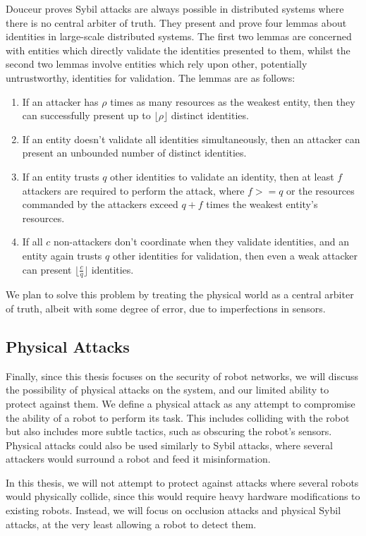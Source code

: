 Douceur \cite{SybilAttack} proves Sybil attacks are always possible in distributed systems where there is no central arbiter of truth. They present and prove four lemmas about identities in large-scale distributed systems. The first two lemmas are concerned with entities which directly validate the identities presented to them, whilst the second two lemmas involve entities which rely upon other, potentially untrustworthy, identities for validation. The lemmas are as follows:


\begin{enumerate}
    \item If an attacker has $\rho$ times as many resources as the weakest entity, then they can successfully present up to $\lfloor\rho\rfloor$ distinct identities.
    \item If an entity doesn't validate all identities simultaneously, then an attacker can present an unbounded number of distinct identities.
    \item If an entity trusts $q$ other identities to validate an identity, then at least $f$ attackers are required to perform the attack, where $f >= q$ or the resources commanded by the attackers exceed $q + f$ times the weakest entity's resources.
    \item If all $c$ non-attackers don't coordinate when they validate identities, and an entity again trusts $q$ other identities for validation, then even a weak attacker can present $\lfloor\frac{c}{q}\rfloor$ identities.
\end{enumerate}

We plan to solve this problem by treating the physical world as a central arbiter of truth, albeit with some degree of error, due to imperfections in sensors.

\subsection{Physical Attacks}
Finally, since this thesis focuses on the security of robot networks, we will discuss the possibility of physical attacks on the system, and our limited ability to protect against them. We define a physical attack as any attempt to compromise the ability of a robot to perform its task. This includes colliding with the robot but also includes more subtle tactics, such as obscuring the robot's sensors. Physical attacks could also be used similarly to Sybil attacks, where several attackers would surround a robot and feed it misinformation. 

In this thesis, we will not attempt to protect against attacks where several robots would physically collide, since this would require heavy hardware modifications to existing robots. Instead, we will focus on occlusion attacks and physical Sybil attacks, at the very least allowing a robot to detect them.\\